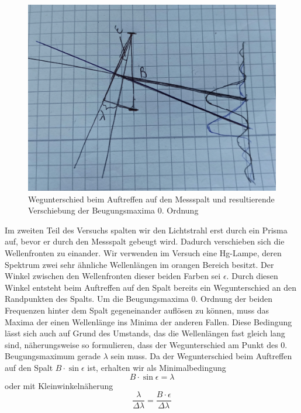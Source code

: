 \documentclass[a4paper, 12pt]{scrartcl}
\begin{document}
\begin{figure}[H]\centering\includegraphics[scale=0.15]{Prisma1}\caption{Wegunterschied beim Auftreffen auf den Messspalt und resultierende Verschiebung der Beugungsmaxima 0. Ordnung}\end{figure}
Im zweiten Teil des Versuchs spalten wir den Lichtstrahl erst durch ein Prisma auf, bevor er durch den Messspalt gebeugt wird. Dadurch verschieben sich die Wellenfronten zu einander. Wir verwenden im Versuch eine Hg-Lampe, deren Spektrum zwei sehr ähnliche Wellenlängen im orangen Bereich besitzt. Der Winkel zwischen den Wellenfronten dieser beiden Farben sei $\epsilon$. Durch diesen Winkel entsteht beim Auftreffen auf den Spalt bereits ein Wegunterschied an den Randpunkten des Spalts. Um die Beugungsmaxima 0. Ordnung der beiden Frequenzen hinter dem Spalt gegeneinander auflösen zu können, muss das Maxima der einen Wellenlänge ins Minima der anderen Fallen. Diese Bedingung lässt sich auch auf Grund des Umstands, das die Wellenlängen fast gleich lang sind, näherungsweise so formulieren, dass der Wegunterschied am Punkt des 0. Beugungsmaximum gerade $\lambda$ sein muss. Da der Wegunterschied beim Auftreffen auf den Spalt $B\cdot\sin\epsilon$ ist, erhalten wir als Minimalbedingung
\begin{equation*}B\cdot\sin\epsilon=\lambda\end{equation*}
oder mit Kleinwinkelnäherung
\begin{equation}\frac{\lambda}{\Delta\lambda}=\frac{B\cdot\epsilon}{\Delta\lambda}\end{equation}
\end{document}
